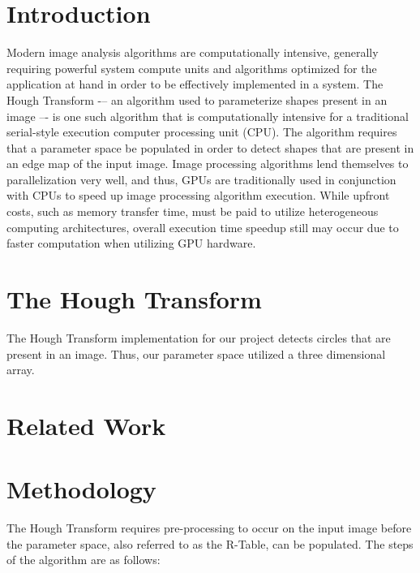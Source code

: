 \documentclass[conference]{IEEEtran}
\begin{document}






\section{Introduction}
Modern image analysis algorithms are computationally intensive, generally requiring powerful system compute units and algorithms optimized for the application at hand in order to be effectively implemented in a system. 
The Hough Transform\cite{BALLARD1981111} -– an algorithm used to parameterize shapes present in an image –- is one such algorithm that is computationally intensive for a traditional serial-style execution computer processing unit (CPU).
The algorithm requires that a parameter space be populated in order to detect shapes that are present in an edge map of the input image.
Image processing algorithms lend themselves to parallelization very well, and thus, GPUs are traditionally used in conjunction with CPUs to speed up image processing algorithm execution.
While upfront costs, such as memory transfer time, must be paid to utilize heterogeneous computing architectures, overall execution time speedup still may occur due to faster computation when utilizing GPU hardware.


\section{The Hough Transform}
The Hough Transform implementation for our project detects circles that are present in an image.
Thus, our parameter space utilized a three dimensional array. 

\section{Related Work}


\section{Methodology}
The Hough Transform requires pre-processing to occur on the input image before the parameter space, also referred to as the R-Table, can be populated.
The steps of the algorithm are as follows:
\end{document}
